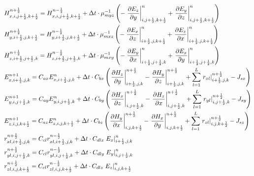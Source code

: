 \documentclass[pdftex,a4paper,parskip,listof=totoc,bibliography=totoc,onehalfspacing,12pt]{scrreprt}
\begin{document}
\begin{equation}
\begin{align*}
  &H_{x,i,j+\frac{1}{2},k+\frac{1}{2}}^{n+\frac{1}{2}} = H_{x,i,j+\frac{1}{2},k+\frac{1}{2}}^{n-\frac{1}{2}} + \Delta t \cdot \mu_{myz}^{-1}  \left(- \left.\pdv{ E_{z}}{y}\right\rvert_{i,j+\frac{1}{2},k+\frac{1}{2}}^{n} + \left.\pdv{ E_{y}}{z}\right\rvert_{i,j+\frac{1}{2},k+\frac{1}{2}}^{n} \right)\\
  &H_{y,i+\frac{1}{2},j,k+\frac{1}{2}}^{n+\frac{1}{2}} = H_{y,i+\frac{1}{2},j,k+\frac{1}{2}}^{n-\frac{1}{2}} + \Delta t \cdot \mu_{mxz}^{-1}  \left(- \left.\pdv{ E_{x}}{z}\right\rvert_{i+\frac{1}{2},j,k+\frac{1}{2}}^{n} + \left.\pdv{ E_z}{x}\right\rvert_{i+\frac{1}{2},j,k+\frac{1}{2}}^{n} \right)\\
  &H_{z,i+\frac{1}{2},j+\frac{1}{2},k}^{n+\frac{1}{2}} = H_{z,i+\frac{1}{2},j+\frac{1}{2},k}^{n-\frac{1}{2}} + \Delta t \cdot \mu_{mxy}^{-1}  \left(- \left.\pdv{ E_y}{x}\right\rvert_{i+\frac{1}{2},j+\frac{1}{2},k}^{n} + \left.\pdv{ E_x}{y}\right\rvert_{i+\frac{1}{2},j+\frac{1}{2},k}^{n} \right)\\
  &E_{x,i+\frac{1}{2},j,k}^{n+1} = C_{ax} E_{x,i+\frac{1}{2},j,k}^{n} + \Delta t \cdot C_{bx} \left( \left.\pdv{ H_z}{y}\right\rvert_{i+\frac{1}{2},j,k}^{n+\frac{1}{2}} - \left.\pdv{ H_y}{z}\right\rvert_{i+\frac{1}{2},j,k}^{n+\frac{1}{2}} + \sum_{l=1}^L \left. r_{xl}\right\rvert_{i+\frac{1}{2},j,k}^{n+\frac{1}{2}} - J_{sx} \right)\\ 
  &E_{y,i,j+\frac{1}{2},k}^{n+1} = C_{ay} E_{y,i,j+\frac{1}{2},k}^{n} + \Delta t \cdot C_{by} \left( \left.\pdv{ H_x}{z}\right\rvert_{i,j+\frac{1}{2},k}^{n+\frac{1}{2}} - \left.\pdv{ H_z}{x}\right\rvert_{i,j+\frac{1}{2},k}^{n+\frac{1}{2}} + \sum_{l=1}^L \left. r_{yl}\right\rvert_{i,j+\frac{1}{2},k}^{n+\frac{1}{2}} - J_{sy} \right)\\
  &E_{z,i,j,k+\frac{1}{2}}^{n+1} = C_{az} E_{z,i,j,k+\frac{1}{2}}^{n} + \Delta t \cdot C_{bz} \left( \left.\pdv{ H_y}{x}\right\rvert_{i,j,k+\frac{1}{2}}^{n+\frac{1}{2}} - \left.\pdv{ H_x}{y}\right\rvert_{i,j,k+\frac{1}{2}}^{n+\frac{1}{2}} + \sum_{l=1}^L \left. r_{zl}\right\rvert_{i,j,k+\frac{1}{2}}^{n+\frac{1}{2}} - J_{sz} \right)\\
  &r_{xl,i+\frac{1}{2},j,k}^{n+\frac{1}{2}} = C_{c l} r_{xl,i+\frac{1}{2},j,k}^{n-\frac{1}{2}} + \Delta t \cdot C_{d l x} \left.E_x \right\rvert_{i+\frac{1}{2},j,k}^{n}\\
  &r_{yl,i,j+\frac{1}{2},k}^{n+\frac{1}{2}} = C_{c l} r_{yl,i,j+\frac{1}{2},k}^{n-\frac{1}{2}} + \Delta t \cdot C_{d l y} \left.E_y \right\rvert_{i,j+\frac{1}{2},k}^{n}\\
  &r_{zl,i,j,k+\frac{1}{2}}^{n+\frac{1}{2}} = C_{c l} r_{zl,i,j,k+\frac{1}{2}}^{n-\frac{1}{2}} + \Delta t \cdot C_{d l z} \left.E_z \right\rvert_{i,j,k+\frac{1}{2}}^{n}
\end{align*}
\end{equation}
\end{document}
